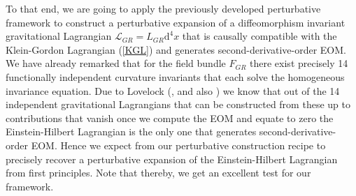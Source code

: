 To that end, we are going to apply the previously developed perturbative framework to construct a perturbative expansion of a diffeomorphism invariant gravitational Lagrangian $\mathcal{L}_{GR} = L_{GR} \mathrm{d}^4x$ that is causally compatible with the Klein-Gordon Lagrangian (\ref{KGL}) and generates second-derivative-order EOM. 
We have already remarked that for the field bundle $F_{GR}$ there exist precisely 14 functionally independent curvature invariants that each solve the homogeneous invariance equation. Due to Lovelock (\cite{Lovelock1969}, \cite{doi:10.1063/1.1665613} and also \cite{doi:10.1063/1.1666069}) we know that out of the 14 independent gravitational Lagrangians that can be constructed from these up to contributions that vanish once we compute the EOM and equate to zero the Einstein-Hilbert Lagrangian is the only one that generates second-derivative-order EOM. 
Hence we expect from our perturbative construction recipe to precisely recover a perturbative expansion of the Einstein-Hilbert Lagrangian from first principles. Note that thereby, we get an excellent test for our framework. 


